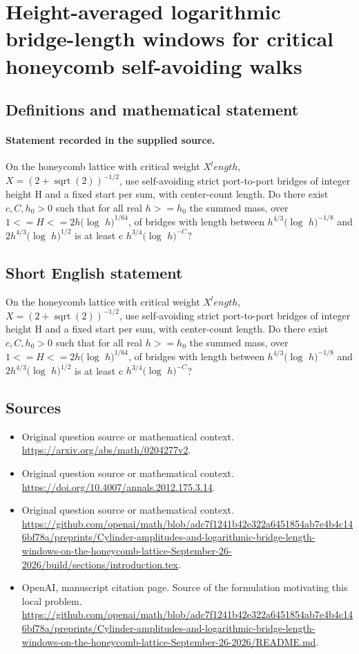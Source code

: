 \documentclass[11pt]{article}
\begin{document}
\section*{Height-averaged logarithmic bridge-length windows for critical honeycomb self-avoiding walks}\label{statement}
\subsection{Definitions and mathematical statement}
\paragraph{Statement recorded in the supplied source.}
On the honeycomb lattice with critical weight $X^length$, $X=(2+\operatorname{sqrt}(2))^{-1/2}$, use self-avoiding strict port-to-port bridges of integer height H and a fixed start per sum, with center-count length. Do there exist $c,C,h_0>0$ such that for all real $h>=h_0$ the summed mass, over $1<=H<=2h(\log $ $h)^{1/64}$, of bridges with length between $h^{4/3}(\log $ $h)^{-1/8}$ and $2h^{4/3}(\log $ $h)^{1/2}$ is at least c $h^{3/4}(\log $ $h)^{-C}$?
\subsection{Short English statement}
On the honeycomb lattice with critical weight $X^length$, $X=(2+\operatorname{sqrt}(2))^{-1/2}$, use self-avoiding strict port-to-port bridges of integer height H and a fixed start per sum, with center-count length. Do there exist $c,C,h_0>0$ such that for all real $h>=h_0$ the summed mass, over $1<=H<=2h(\log $ $h)^{1/64}$, of bridges with length between $h^{4/3}(\log $ $h)^{-1/8}$ and $2h^{4/3}(\log $ $h)^{1/2}$ is at least c $h^{3/4}(\log $ $h)^{-C}$?
\subsection{Sources}
\begin{itemize}
\item[S1] Original question source or mathematical context.
\url{https://arxiv.org/abs/math/0204277v2}.
\item[S2] Original question source or mathematical context.
\url{https://doi.org/10.4007/annals.2012.175.3.14}.
\item[S3] Original question source or mathematical context.
\url{https://github.com/openai/math/blob/adc7f1241b42e322a6451854ab7e4b4c146bf78a/preprints/Cylinder-amplitudes-and-logarithmic-bridge-length-windows-on-the-honeycomb-lattice-September-26-2026/build/sections/introduction.tex}.
\item[S4] OpenAI, manuscript citation page. Source of the formulation motivating this local problem.
\url{https://github.com/openai/math/blob/adc7f1241b42e322a6451854ab7e4b4c146bf78a/preprints/Cylinder-amplitudes-and-logarithmic-bridge-length-windows-on-the-honeycomb-lattice-September-26-2026/README.md}.
\end{itemize}
\end{document}
